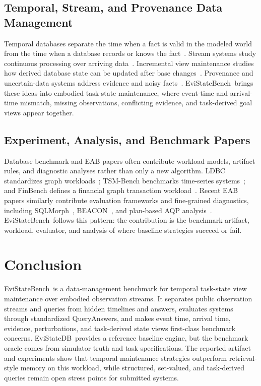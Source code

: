 \documentclass[conference]{IEEEtran}
\newcommand{\bench}{EviStateBench}
\newcommand{\engine}{EviStateDB}
\begin{document}
\subsection{Temporal, Stream, and Provenance Data Management}

Temporal databases separate the time when a fact is valid in the modeled world from the time when a database records or knows the fact~\cite{snodgrass1999developing,jensen1999temporal}. Stream systems study continuous processing over arriving data~\cite{babcock2002models,garofalakis2016data}. Incremental view maintenance studies how derived database state can be updated after base changes~\cite{gupta1995maintenance,zhuge1995view}. Provenance and uncertain-data systems address evidence and noisy facts~\cite{green2007provenance,cheney2009provenance,aggarwal2009uncertain,dalvi2007efficient}. \bench\ brings these ideas into embodied task-state maintenance, where event-time and arrival-time mismatch, missing observations, conflicting evidence, and task-derived goal views appear together.

\subsection{Experiment, Analysis, and Benchmark Papers}

Database benchmark and EAB papers often contribute workload models, artifact rules, and diagnostic analyses rather than only a new algorithm. LDBC standardizes graph workloads~\cite{erling2015ldbc,iosup2016ldbc}; TSM-Bench benchmarks time-series systems~\cite{khelifati2023tsmbench}; and FinBench defines a financial graph transaction workload~\cite{qi2025finbench}. Recent EAB papers similarly contribute evaluation frameworks and fine-grained diagnostics, including SQLMorph~\cite{malekpour2026sqlmorph}, BEACON~\cite{najafi2025beacon}, and plan-based AQP analysis~\cite{mu2025aqp}. \bench\ follows this pattern: the contribution is the benchmark artifact, workload, evaluator, and analysis of where baseline strategies succeed or fail.

\section{Conclusion}

\bench\ is a data-management benchmark for temporal task-state view maintenance over embodied observation streams. It separates public observation streams and queries from hidden timelines and answers, evaluates systems through standardized QueryAnswers, and makes event time, arrival time, evidence, perturbations, and task-derived state views first-class benchmark concerns. \engine\ provides a reference baseline engine, but the benchmark oracle comes from simulator truth and task specifications. The reported artifact and experiments show that temporal maintenance strategies outperform retrieval-style memory on this workload, while structured, set-valued, and task-derived queries remain open stress points for submitted systems.
\end{document}
